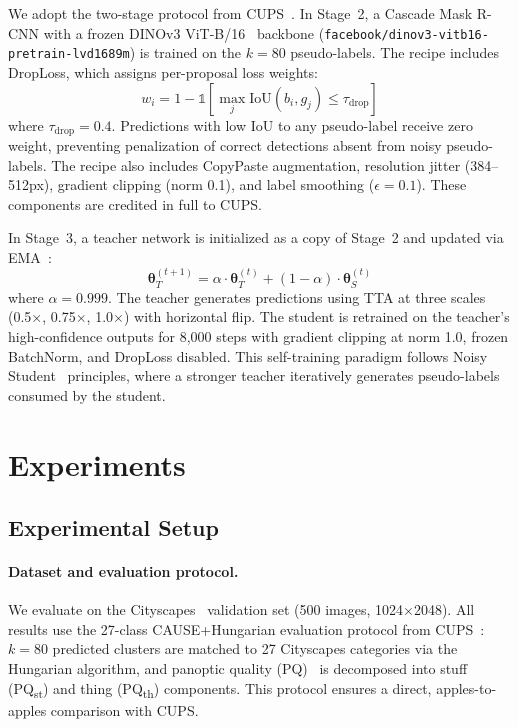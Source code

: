 \documentclass{bmvc2k}
\newcommand{\pqt}{PQ\textsubscript{th}\xspace}
\newcommand{\pqs}{PQ\textsubscript{st}\xspace}
\begin{document}
We adopt the two-stage protocol from CUPS~\cite{hahn2025cups}. In Stage~2, a Cascade Mask R-CNN with a frozen DINOv3 ViT-B/16~\cite{fang2025dinov3} backbone (\texttt{facebook/dinov3-vitb16-pretrain-lvd1689m}) is trained on the $k{=}80$ pseudo-labels. The recipe includes DropLoss, which assigns per-proposal loss weights:
\begin{equation}
w_i = 1 - \mathbb{1}[\max_j \text{IoU}(b_i, g_j) \leq \tau_\text{drop}]
\label{eq:droploss}
\end{equation}
where $\tau_\text{drop}{=}0.4$. Predictions with low IoU to any pseudo-label receive zero weight, preventing penalization of correct detections absent from noisy pseudo-labels. The recipe also includes CopyPaste augmentation, resolution jitter (384--512px), gradient clipping (norm 0.1), and label smoothing ($\epsilon{=}0.1$). These components are credited in full to CUPS.

In Stage~3, a teacher network is initialized as a copy of Stage~2 and updated via EMA~\cite{tarvainen2017mean}:
\begin{equation}
\boldsymbol{\theta}_T^{(t+1)} = \alpha \cdot \boldsymbol{\theta}_T^{(t)} + (1 - \alpha) \cdot \boldsymbol{\theta}_S^{(t)}
\label{eq:ema}
\end{equation}
where $\alpha{=}0.999$. The teacher generates predictions using TTA at three scales (0.5$\times$, 0.75$\times$, 1.0$\times$) with horizontal flip. The student is retrained on the teacher's high-confidence outputs for 8,000 steps with gradient clipping at norm 1.0, frozen BatchNorm, and DropLoss disabled. This self-training paradigm follows Noisy Student~\cite{xie2020noisy} principles, where a stronger teacher iteratively generates pseudo-labels consumed by the student.

\section{Experiments}
\label{sec:experiments}

\subsection{Experimental Setup}

\paragraph{Dataset and evaluation protocol.}
We evaluate on the Cityscapes~\cite{cordts2016cityscapes} validation set (500 images, 1024$\times$2048). All results use the 27-class CAUSE+Hungarian evaluation protocol from CUPS~\cite{hahn2025cups}: $k{=}80$ predicted clusters are matched to 27 Cityscapes categories via the Hungarian algorithm, and panoptic quality (PQ)~\cite{kirillov2019panoptic} is decomposed into stuff (\pqs) and thing (\pqt) components. This protocol ensures a direct, apples-to-apples comparison with CUPS.
\end{document}
